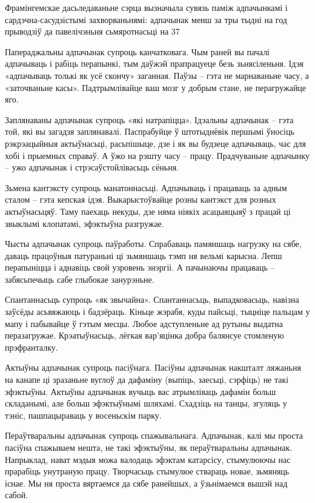Фрамінгемскае дасьледаваньне сэрца вызначыла сувязь паміж адпачынкамі і сардэчна-сасудзістымі захворваньнямі: адпачынак менш за тры тыдні на год прыводзіў да павелічэньня сьмяротнасьці на 37%

Папераджальны адпачынак супроць канчатковага. Чым раней вы пачалі адпачываць і рабіць перапынкі, тым даўжэй прапрацуеце безь зьнясіленьня. Ідэя «адпачываць толькі як усё скончу» заганная. Паўзы – гэта не марнаваньне часу, а «заточваньне касы». Падтрымлівайце ваш мозг у добрым стане, не перагружайце яго.

Заплянаваны адпачынак супроць «які натрапіцца». Ідэальны адпачынак – гэта той, які вы загадзя заплянавалі. Паспрабуйце ў штотыднёвік першымі ўносіць рэкрэацыйныя актыўнасьці, расьпішыце, дзе і як вы будзеце адпачываць, час для хобі і прыемных справаў. А ўжо на рэшту часу – працу. Прадчуваньне адпачынку – ужо адпачынак і стрэсаўстойлівасьць сёньня.

Зьмена кантэксту супроць манатоннасьці. Адпачываць і працаваць за адным сталом – гэта кепская ідэя. Выкарыстоўвайце розны кантэкст для розных актыўнасьцяў. Таму паехаць некуды, дзе няма ніякіх асацыяцыяў з працай ці звыклымі клопатамі, эфэктыўна разгружае.

Чысты адпачынак супроць паўработы. Спрабаваць памяншаць нагрузку на сябе, даваць працоўныя патураньні ці зьмяншаць тэмп ня вельмі карысна. Лепш перапыніцца і аднавіць свой узровень энэргіі. А пачынаючы працаваць – забясьпечыць сабе глыбокае занурэньне.

Спантаннасьць супроць «як звычайна». Спантаннасьць, выпадковасьць, навізна заўсёды асьвяжаюць і бадзёраць. Кіньце жэрабя, куды пайсьці, тыцніце пальцам у мапу і пабывайце ў гэтым месцы. Любое адступленьне ад рутыны выдатна перазагружае. Крэатыўнасьць, лёгкая вар'яцінка добра балянсуе стомленую прэфранталку.

Актыўны адпачынак супроць пасіўнага. Пасіўны адпачынак накшталт ляжаньня на канапе ці зразаньне вуглоў да дафаміну (выпіць, заесьці, сэрфіць) не такі эфэктыўны. Актыўны адпачынак вучыць вас атрымліваць дафамін больш складанымі, але больш эфэктыўнымі шляхамі. Схадзіць на танцы, згуляць у тэніс, пашпацыраваць у восеньскім парку.

Пераўтваральны адпачынак супроць спажывальнага. Адпачынак, калі мы проста пасіўна спажываем нешта, не такі эфэктыўны, як пераўтваральны адпачынак. Напрыклад, нават мэдыя можа валодаць эфэктам катарсісу, стымулюючы нас прарабіць унутраную працу. Творчасьць стымулюе ствараць новае, зьмяняць існае. Мы ня проста вяртаемся да сябе ранейшых, а ўзьнімаемся вышэй над сабой.

